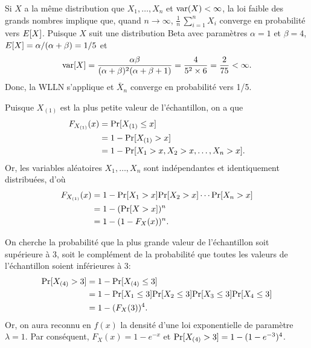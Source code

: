 \begin{solution}{1.10}
Si $X$ a la même distribution que $X_1, \ldots , X_n$ et $\operatorname{var}(X)<\infty$, la loi faible des grands nombres implique que, quand $n \to \infty$,
$
\frac{1}{n} \, \sum_{i=1}^n X_i
$
converge en probabilité vers $E [ X ]$. Puisque $X$ suit une distribution Beta avec paramètres $\alpha=1$ et $\beta=4$,  $E [ X ]=\alpha/(\alpha+\beta)=1/5$ et
$$
\mathrm{var} [ X ]=\frac{\alpha\beta}{(\alpha+\beta)^2(\alpha+\beta+1)}=\frac{4}{5^2\times 6}=\frac{2}{75}<\infty.
$$
Donc, la WLLN s'applique et $\bar X_n$ converge en probabilité vers 1/5.
\end{solution}
\begin{solution}{1.11}
    Puisque $X_{(1)}$ est la plus petite valeur de l'échantillon, on a
    que
    \begin{align*}
      F_{X_{(1)}}(x)
      &= \mathrm{Pr} [ X_{(1)} \leq x ] \\
      &= 1 - \mathrm{Pr} [ X_{(1)} > x ] \\
      &= 1 - \mathrm{Pr} [ X_1 > x, X_2 > x, \dots, X_n > x ].
    \end{align*}
    Or, les variables aléatoires $X_1, \dots, X_n$ sont indépendantes
    et identiquement distribuées, d'où
    \begin{align*}
      F_{X_{(1)}}(x)
      &= 1 - \mathrm{Pr} [ X_1 > x ] \mathrm{Pr} [ X_2 > x ] \cdots \mathrm{Pr} [ X_n > x ] \\
      &= 1 - (\mathrm{Pr} [ X > x ])^n \\
      &= 1 - (1 -  F_X(x))^n.
    \end{align*}
  
\end{solution}
\begin{solution}{1.12}
    On cherche la probabilité que la plus grande valeur de
    l'échantillon soit supérieure à 3, soit le complément de la
    probabilité que toutes les valeurs de l'échantillon soient
    inférieures à 3:
    \begin{align*}
      \mathrm{Pr} [ X_{(4)} > 3 ]
      &= 1 - \mathrm{Pr} [ X_{(4)} \leq 3 ] \\
      &= 1 - \mathrm{Pr} [ X_1 \leq 3 ] \mathrm{Pr} [ X_2 \leq 3 ]
      \mathrm{Pr} [ X_3 \leq 3 ] \mathrm{Pr} [ X_4 \leq 3 ] \\
      &= 1 - (F_X(3))^4.
    \end{align*}
    Or, on aura reconnu en $f(x)$ la densité d'une loi exponentielle
    de paramètre $\lambda = 1$. Par conséquent, $F_X(x) = 1 - e^{-x}$
    et $\mathrm{Pr} [ X_{(4)} > 3 ] = 1 - (1 - e^{-3})^4$.
  
\end{solution}
